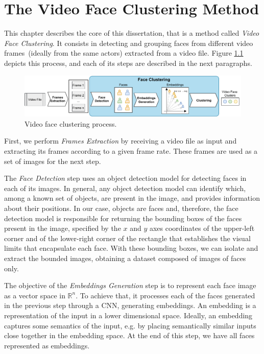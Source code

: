 \chapter{The Video Face Clustering Method}
\label{chap:video_face_clustering}

This chapter describes the core of this dissertation, that is a method called \emph{Video Face Clustering}.
It consists in detecting and grouping faces from different video frames~(ideally from the same actors) extracted from a video file.
Figure \ref{fig:video_face_clustering} depicts this process, and each of its steps are described in the next paragraphs.

\begin{figure}[!ht]
    \centering
    \includegraphics[width=\textwidth]{img/face_clustering/video_face_clustering.pdf}
    \caption{Video face clustering process.}
    \label{fig:video_face_clustering}
\end{figure}


First, we perform \textit{Frames Extraction} by receiving a video file as input and extracting its frames according to a given frame rate. 
These frames are used as a set of images for the next step.

The \textit{Face Detection} step uses an object detection model for detecting faces in each of its images.
In general, any object detection model can identify which, among a known set of objects, are present in the image, and provides information about their positions.
In our case, objects are faces and, therefore, the face detection model is responsible for returning the bounding boxes of the faces present in the image, specified by the $x$ and $y$ axes coordinates of the upper-left corner and of the lower-right corner of the rectangle that establishes the visual limits that encapsulate each face. 
With these bounding boxes, we can isolate and extract the bounded images, obtaining a dataset composed of images of faces only.


The objective of the \textit{Embeddings Generation} step is to represent each face image as a vector space in $\mathbb{R}^{n}$.
To achieve that, it processes each of the faces generated in the previous step through a CNN, generating embeddings. 
An embedding is a representation of the input in a lower dimensional space.
Ideally, an embedding captures some semantics of the input, e.g. by placing semantically similar inputs close together in the embedding space.
%
At the end of this step, we have all faces represented as embeddings.

